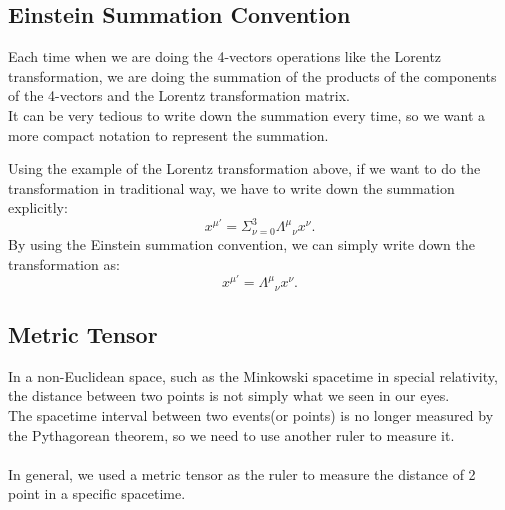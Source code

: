 \subsection{Einstein Summation Convention}
\begin{intuition}
  Each time when we are doing the 4-vectors operations like the Lorentz transformation, we are doing the summation of the products of the components of the 4-vectors and the Lorentz transformation matrix. \\

  It can be very tedious to write down the summation every time, so we want a more compact notation to represent the summation.
\end{intuition}
\begin{theory}
  Using the example of the Lorentz transformation above, if we want to do the transformation in traditional way, we have to write down the summation explicitly:
  \[
    x^{\mu'} = \Sigma_{\nu=0}^3 \Lambda^\mu{}_\nu x^\nu.
  \]
  \smallskip\noindent
  By using the Einstein summation convention, we can simply write down the transformation as:
  \[
    x^{\mu'} = \Lambda^\mu{}_\nu x^\nu.
  \]
\end{theory}


\bigskip\noindent
\subsection{Metric Tensor}
\begin{intuition}
  In a non-Euclidean space, such as the Minkowski spacetime in special relativity, the distance between two points is not simply what we seen in our eyes. \\
  The spacetime interval between two events(or points) is no longer measured by the Pythagorean theorem, so we need to use another ruler to measure it. \\
  \\ 
  In general, we used a metric tensor as the ruler to measure the distance of 2 point in a specific spacetime.
\end{intuition}

